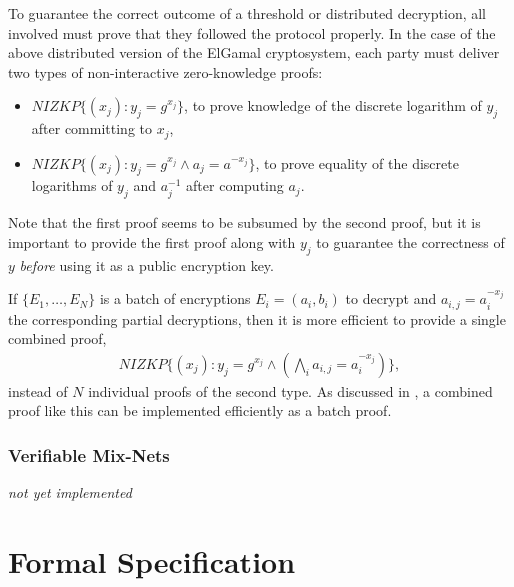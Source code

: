 \documentclass[bibtotoc,halfparskip,oneside]{scrreprt}
\begin{document}
To guarantee the correct outcome of a threshold or distributed decryption, all involved must prove that they followed the protocol properly. In the case of the above distributed version of the ElGamal cryptosystem, each party must deliver two types of non-interactive zero-knowledge proofs:
\begin{itemize}
\item $\mathit{NIZKP}\{(x_j):y_j=g^{x_j}\}$, to prove knowledge of the discrete logarithm of $y_j$ after committing to $x_j$,
\item $\mathit{NIZKP}\{(x_j):y_j=g^{x_j} \wedge a_j=a^{-x_j}\}$, to prove equality of the discrete logarithms of $y_j$ and $a_j^{-1}$ after computing $a_j$.
\end{itemize}
Note that the first proof seems to be subsumed by the second proof, but it is important to provide the first proof along with $y_j$ to guarantee the correctness of $y$ \emph{before} using it as a public encryption key.

If $\{E_1,\ldots,E_N\}$ is a batch of encryptions $E_i=(a_i,b_i)$ to decrypt and $a_{i,j}=a_i^{-x_j}$ the corresponding partial decryptions, then it is more efficient to provide a single combined  proof,
\begin{align}
\mathit{NIZKP}\{(x_j):y_j=g^{x_j} \wedge (\bigwedge_i a_{i,j}=a_i^{-x_j})\},
\end{align}
instead of $N$ individual proofs of the second type. As discussed in , a combined proof like this can be implemented efficiently as a batch proof.

\section{Verifiable Mix-Nets}

\emph{not yet implemented}


\part{Formal Specification}


\end{document}
